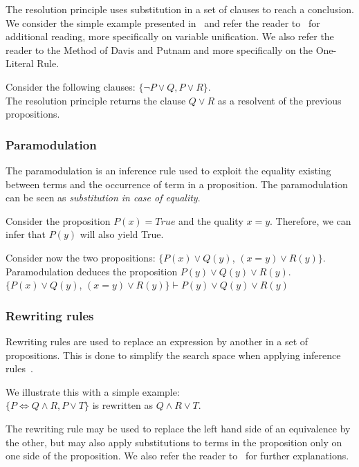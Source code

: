 The resolution principle uses substitution in a set of clauses to reach a conclusion.
We consider the simple example presented in~\cite{snark-Stickel2000} and refer the reader to~\cite{symbolic-proof} for additional reading, more specifically on variable unification.
We also refer the reader to the Method of Davis and Putnam and more specifically on the One-Literal Rule.

Consider the following clauses: $\{\neg P \vee Q,P \vee R\}$.\\
The resolution principle returns the clause $Q \vee R$ as a resolvent of the previous propositions.

\subsubsection{Paramodulation}
The paramodulation is an inference rule used to exploit the equality existing between terms and the occurrence of term in a proposition. The paramodulation can be seen as \textit{substitution in case of equality}.

Consider the proposition $P(x) = True$ and the quality $x=y$. Therefore, we can infer that $P(y)$ will also yield True.

Consider now the two propositions: $\{P(x) \vee Q(y)$, $(x = y) \vee R(y)\}$.\\
Paramodulation deduces the proposition $P(y) \vee Q(y) \vee R(y)$.\\
$\{P(x) \vee Q(y)$, $(x = y) \vee R(y)\} \vdash P(y) \vee Q(y) \vee R(y)$

\subsubsection{Rewriting rules}
Rewriting rules are used to replace an expression by another in a set of propositions.
This is done to simplify the search space when applying inference rules~\cite{snark-Stickel2000}.

We illustrate this with a simple example:\\
$\{P \Leftrightarrow Q \wedge R, P \vee T\}$ is rewritten as $Q \wedge R \vee T$. 

The rewriting rule may be used to replace the left hand side of an equivalence by the other, but may also apply substitutions to terms in the proposition only on one side of the proposition.
We also refer the reader to~\cite{snark-Stickel2000,symbolic-proof} for further explanations.
